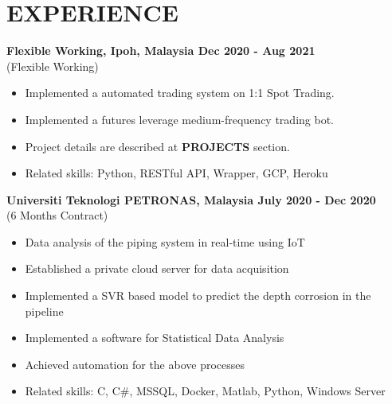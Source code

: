 \vspace{0.3cm}
\section{EXPERIENCE}

\textbf{Flexible Working, Ipoh, Malaysia
\hfill{Dec 2020 - Aug 2021}} \vspace{0.1cm} \\
 {(Flexible Working)} \vspace{0.15cm}
    \begin{itemize}
        \item Implemented a automated trading system on 1:1 Spot Trading.
        \item Implemented a futures leverage medium-frequency trading bot.
        \item Project details are described at \textbf{PROJECTS} section.
        \item Related skills: Python, RESTful API, Wrapper, GCP, Heroku 
    \end{itemize}

\textbf{Universiti Teknologi PETRONAS, Malaysia
\hfill{July 2020 - Dec 2020}} \vspace{0.1cm} \\
 {(6 Months Contract)} \vspace{0.15cm}
    \begin{itemize}
        \item Data analysis of the piping system in real-time using IoT
        \item Established a private cloud server for data acquisition
        \item Implemented a SVR based model to predict the depth corrosion in the pipeline
        \item Implemented a software for Statistical Data Analysis 
        \item Achieved automation for the above processes
        \item Related skills: C, C\#, MSSQL, Docker, Matlab, Python, Windows Server
    \end{itemize}
    
